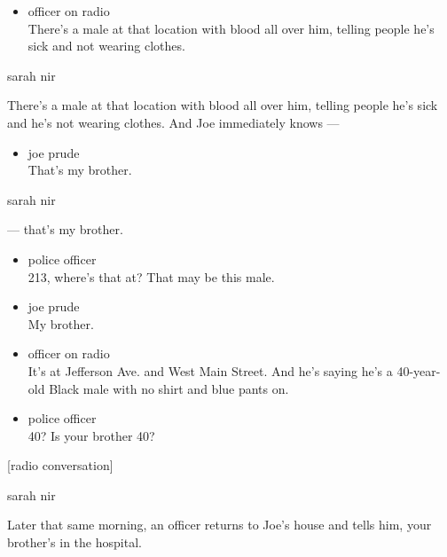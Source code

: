 \begin{itemize}
\tightlist
\item
  officer on radio\\
  There's a male at that location with blood all over him, telling
  people he's sick and not wearing clothes.
\end{itemize}

sarah nir

There's a male at that location with blood all over him, telling people
he's sick and he's not wearing clothes. And Joe immediately knows ---

\begin{itemize}
\tightlist
\item
  joe prude\\
  That's my brother.
\end{itemize}

sarah nir

--- that's my brother.

\begin{itemize}
\item
  police officer\\
  213, where's that at? That may be this male.
\item
  joe prude\\
  My brother.
\item
  officer on radio\\
  It's at Jefferson Ave. and West Main Street. And he's saying he's a
  40-year-old Black male with no shirt and blue pants on.
\item
  police officer\\
  40? Is your brother 40?
\end{itemize}

{[}radio conversation{]}

sarah nir

Later that same morning, an officer returns to Joe's house and tells
him, your brother's in the hospital.

